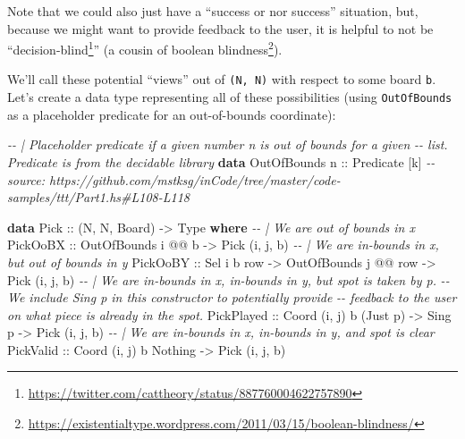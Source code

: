 \documentclass[]{article}
\newenvironment{Shaded}{}{}
\newcommand{\CommentTok}[1]{\textcolor[rgb]{0.38,0.63,0.69}{\textit{#1}}}
\newcommand{\DataTypeTok}[1]{\textcolor[rgb]{0.56,0.13,0.00}{#1}}
\newcommand{\KeywordTok}[1]{\textcolor[rgb]{0.00,0.44,0.13}{\textbf{#1}}}
\newcommand{\NormalTok}[1]{#1}
\newcommand{\OperatorTok}[1]{\textcolor[rgb]{0.40,0.40,0.40}{#1}}
\newcommand{\OtherTok}[1]{\textcolor[rgb]{0.00,0.44,0.13}{#1}}
\renewcommand{\href}[2]{#2\footnote{\url{#1}}}
\begin{document}
Note that we could also just have a ``success or nor success'' situation, but,
because we might want to provide feedback to the user, it is helpful to not be
``\href{https://twitter.com/cattheory/status/887760004622757890}{decision-blind}''
(a cousin of
\href{https://existentialtype.wordpress.com/2011/03/15/boolean-blindness/}{boolean
blindness}).

We'll call these potential ``views'' out of \texttt{(N,\ N)} with respect to
some board \texttt{b}. Let's create a data type representing all of these
possibilities (using \texttt{OutOfBounds} as a placeholder predicate for an
out-of-bounds coordinate):

\begin{Shaded}
\begin{Highlighting}[]
\CommentTok{{-}{-} | Placeholder predicate if a given number \textasciigrave{}n\textasciigrave{} is out of bounds for a given}
\CommentTok{{-}{-} list.  Predicate is from the \textquotesingle{}decidable\textquotesingle{} library}
\KeywordTok{data} \DataTypeTok{OutOfBounds}\OtherTok{ n ::} \DataTypeTok{Predicate}\NormalTok{ [k]}
\CommentTok{{-}{-} source: https://github.com/mstksg/inCode/tree/master/code{-}samples/ttt/Part1.hs\#L108{-}L118}

\KeywordTok{data} \DataTypeTok{Pick}\OtherTok{ ::}\NormalTok{ (}\DataTypeTok{N}\NormalTok{, }\DataTypeTok{N}\NormalTok{, }\DataTypeTok{Board}\NormalTok{) }\OtherTok{{-}>} \DataTypeTok{Type} \KeywordTok{where}
    \CommentTok{{-}{-} | We are out of bounds in x}
    \DataTypeTok{PickOoBX}\OtherTok{   ::} \DataTypeTok{OutOfBounds}\NormalTok{ i }\OperatorTok{@@}\NormalTok{ b                         }\OtherTok{{-}>} \DataTypeTok{Pick}\NormalTok{ \textquotesingle{}(i, j, b)}
    \CommentTok{{-}{-} | We are in{-}bounds in x, but out of bounds in y}
    \DataTypeTok{PickOoBY}\OtherTok{   ::} \DataTypeTok{Sel}\NormalTok{ i b row        }\OtherTok{{-}>} \DataTypeTok{OutOfBounds}\NormalTok{ j }\OperatorTok{@@}\NormalTok{ row }\OtherTok{{-}>} \DataTypeTok{Pick}\NormalTok{ \textquotesingle{}(i, j, b)}
    \CommentTok{{-}{-} | We are in{-}bounds in x, in{-}bounds in y, but spot is taken by \textasciigrave{}p\textasciigrave{}.}
    \CommentTok{{-}{-} We include \textasciigrave{}Sing p\textasciigrave{} in this constructor to potentially provide}
    \CommentTok{{-}{-} feedback to the user on what piece is already in the spot.}
    \DataTypeTok{PickPlayed}\OtherTok{ ::} \DataTypeTok{Coord}\NormalTok{ \textquotesingle{}(i, j) b (}\DataTypeTok{\textquotesingle{}Just}\NormalTok{ p) }\OtherTok{{-}>} \DataTypeTok{Sing}\NormalTok{ p        }\OtherTok{{-}>} \DataTypeTok{Pick}\NormalTok{ \textquotesingle{}(i, j, b)}
    \CommentTok{{-}{-} | We are in{-}bounds in x, in{-}bounds in y, and spot is clear}
    \DataTypeTok{PickValid}\OtherTok{  ::} \DataTypeTok{Coord}\NormalTok{ \textquotesingle{}(i, j) b }\DataTypeTok{\textquotesingle{}Nothing}                   \OtherTok{{-}>} \DataTypeTok{Pick}\NormalTok{ \textquotesingle{}(i, j, b)}
\end{Highlighting}
\end{Shaded}
\end{document}
